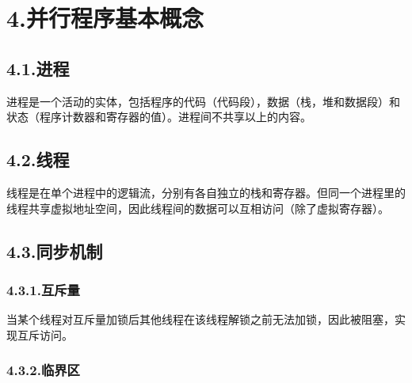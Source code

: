\documentclass{article}
\begin{document}
\section{4.\hspace*{0.5em}并行程序基本概念}\label{section}%

\subsection{4.1.\hspace*{0.5em}进程}\label{section}%

\noindent{}进程是一个活动的实体，包括程序的代码（代码段），数据（栈，堆和数据段）和状态（程序计数器和寄存器的值）。进程间不共享以上的内容。%

\subsection{4.2.\hspace*{0.5em}线程}\label{section}%

\noindent{}线程是在单个进程中的逻辑流，分别有各自独立的栈和寄存器。但同一个进程里的线程共享虚拟地址空间，因此线程间的数据可以互相访问（除了虚拟寄存器）。%

\subsection{4.3.\hspace*{0.5em}同步机制}\label{section}%

\subsubsection{4.3.1.\hspace*{0.5em}互斥量}\label{section}%

\noindent{}当某个线程对互斥量加锁后其他线程在该线程解锁之前无法加锁，因此被阻塞，实现互斥访问。%

\subsubsection{4.3.2.\hspace*{0.5em}临界区}\label{section}%
\end{document}
